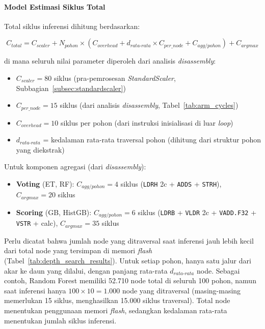 \paragraph{Model Estimasi Siklus Total}

Total siklus inferensi dihitung berdasarkan:

\begin{equation}
    C_{total} = C_{scaler} + N_{pohon} \times (C_{overhead} + d_{rata\text{-}rata} \times C_{per\_node} + C_{agg/pohon}) + C_{argmax}
\end{equation}

di mana seluruh nilai parameter diperoleh dari analisis \textit{disassembly}:
\begin{itemize}
    \item $C_{scaler} = 80$ siklus (pra-pemrosesan \textit{StandardScaler}, Subbagian~\ref{subsec:standardscaler})
    \item $C_{per\_node} = 15$ siklus (dari analisis \textit{disassembly}, Tabel~\ref{tab:arm_cycles})
    \item $C_{overhead} = 10$ siklus per pohon (dari instruksi inisialisasi di luar \textit{loop})
    \item $d_{rata\text{-}rata}$ = kedalaman rata-rata traversal pohon (dihitung dari struktur pohon yang diekstrak)
\end{itemize}

Untuk komponen agregasi (dari \textit{disassembly}):
\begin{itemize}
    \item \textbf{Voting} (ET, RF): $C_{agg/pohon} = 4$ siklus (\texttt{LDRH} 2c + \texttt{ADDS} + \texttt{STRH}), $C_{argmax} = 20$ siklus
    \item \textbf{Scoring} (GB, HistGB): $C_{agg/pohon} = 6$ siklus (\texttt{LDRB} + \texttt{VLDR} 2c + \texttt{VADD.F32} + \texttt{VSTR} + calc), $C_{argmax} = 35$ siklus
\end{itemize}

Perlu dicatat bahwa jumlah node yang ditraversal saat inferensi jauh lebih kecil dari total node yang tersimpan di memori \textit{flash} (Tabel~\ref{tab:depth_search_results}). Untuk setiap pohon, hanya satu jalur dari akar ke daun yang dilalui, dengan panjang rata-rata $d_{rata\text{-}rata}$ node. Sebagai contoh, Random Forest memiliki 52.710 node total di seluruh 100 pohon, namun saat inferensi hanya $100 \times 10 = 1.000$ node yang ditraversal (masing-masing memerlukan 15 siklus, menghasilkan 15.000 siklus traversal). Total node menentukan penggunaan memori \textit{flash}, sedangkan kedalaman rata-rata menentukan jumlah siklus inferensi.

